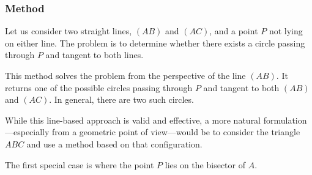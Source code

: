 
\subsubsection{Method } %
\label{ssub:method_c__ll__p}

Let us consider two straight lines, $(AB)$ and $(AC)$, and a point $P$ not lying on either line. The problem is to determine whether there exists a circle passing through $P$ and tangent to both lines.

\medskip
\noindent
This method solves the problem from the perspective of the line $(AB)$. It returns one of the possible circles passing through $P$ and tangent to both $(AB)$ and $(AC)$. In general, there are two such circles.

\medskip
\noindent
While this line-based approach is valid and effective, a more natural formulation—especially from a geometric point of view—would be to consider the triangle $ABC$ and use a method based on that configuration.

\vspace{1em}

\begin{tkzexample}[latex=.5\textwidth]
\begin{center}
\end{center}
\end{tkzexample}

\vspace{1em}
The first special case is where the point $P$ lies on the bisector of $A$.

\vspace{1em}
\begin{tkzexample}[latex=.5\textwidth]
\begin{center}
\end{center}
\end{tkzexample}

